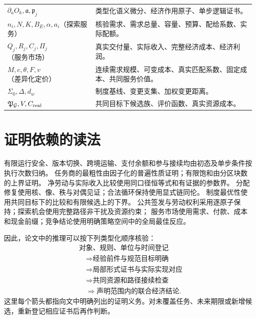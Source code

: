 \documentclass[UTF8,12pt,a4paper,openany,fontset=none,zihao=false]{ctexrep}
\theoremstyle{definition}
\newcommand{\1}{\mathbf 1}
\begin{document}
\begin{longtable}{p{}p{}}
\(\partial_a O_k,\mathfrak a,\mathfrak p_j\) & 类型化语义微分、经济作用原子、单步逻辑证书。\\
\(n_i,N,K,B_E,\alpha,a_i\)（探索服务） & 核验需求、需求总量、容量、预算、配给系数、实际配额。\\
\(Q_j,R_j,C_j,\Pi_j\)（服务市场） & 真实交付量、实际收入、完整经济成本、经济利润。\\
\(M,c,\theta,F,v\)（差异化定价） & 连续需求规模、可变成本、真实匹配系数、固定成本、共同服务价值。\\
\(\Sigma_0,\Delta,d_w\) & 制度基线、变更支集、加权变更距离。\\
\(\mathfrak P_{\mathcal G},V,C_{\rm real}\) & 共同目标下候选族、评价函数、真实资源成本。\\
\bottomrule
\end{longtable}
\endgroup

\section{证明依赖的读法}

有限运行安全、版本切换、跨境运输、支付余额和参与接续均由初态及单步条件按执行次数归纳。
任务商的最粗性由因子化的普遍性质证明；有限饱和由分区块数的上界证明。
净劳动与实际收入比较使用同口径恒等式和有证据的参数界。
分配修复使用核、像、秩与对偶见证；合法循环保持使用显式链同伦。
制度最优性使用共同目标下的比较和有限候选上的下界。
公共签发与劳动权利采用逐原子保持；探索机会使用完整路径非干扰及资源约束；
服务市场使用需求、付款、成本和现金前缀；竞争结论使用明确策略空间中的全局最佳反应。

因此，论文中的推理可以按下列类型化顺序核验：
\[
\begin{aligned}
&\text{对象、规则、单位与时间登记}\\
&\quad\Longrightarrow\text{经验前件与规范目标明确}\\
&\quad\Longrightarrow\text{局部形式证书与实际实现对应}\\
&\quad\Longrightarrow\text{共同资源和路径接续检查}\\
&\quad\Longrightarrow\text{声明范围内的联合经济结论}.
\end{aligned}
\]
这里每个箭头都指向文中明确列出的证明义务。对未覆盖任务、未来期限或新增候选，重新登记相应证书后再作判断。
\end{document}
